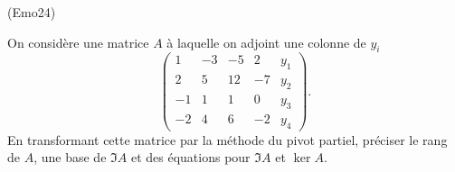 \begin{tiny}(Emo24)\end{tiny} On considère une matrice $A$ à laquelle on adjoint une colonne de $y_i$
\[
\begin{pmatrix}
 1  & -3 & -5 &  2 & y_1  \\
 2  &  5 & 12 & -7 & y_2 \\
 -1 &  1 & 1  &  0 & y_3 \\
 -2 &  4 & 6  & -2 & y_4
\end{pmatrix}
 .
 \]
En transformant cette matrice par la méthode du pivot partiel, préciser le rang de $A$, une base de $\Im A$ et des équations pour $\Im A$ et $\ker A$.